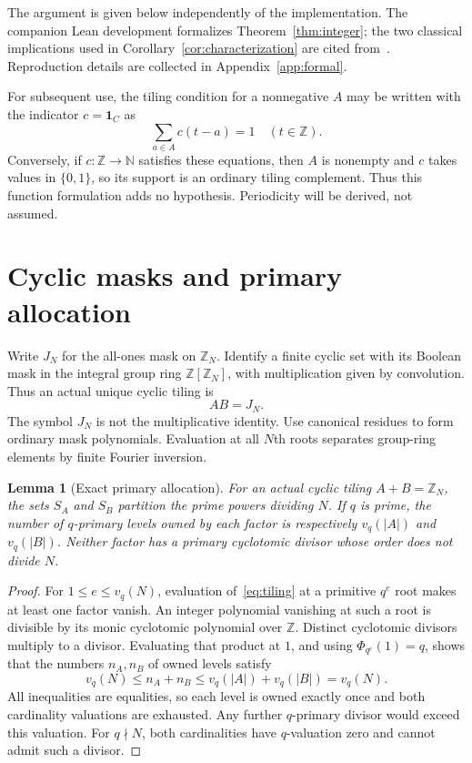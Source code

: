 \documentclass[11pt]{article}
\newtheorem{lemma}[theorem]{Lemma}
\newcommand{\Z}{\mathbb Z}
\newcommand{\PhiC}{\Phi}
\begin{document}
The argument is given below independently of the implementation. The companion Lean development formalizes Theorem~\ref{thm:integer}; the two classical implications used in Corollary~\ref{cor:characterization} are cited from~\cite{CM}. Reproduction details are collected in Appendix~\ref{app:formal}.

For subsequent use, the tiling condition for a nonnegative $A$ may be written with the indicator $c=\mathbf{1}_C$ as
\begin{equation}\label{eq:integer}
 \sum_{a\in A}c(t-a)=1\quad(t\in\Z).
\end{equation}
Conversely, if $c:\Z\to\mathbb N$ satisfies these equations, then $A$ is nonempty and $c$ takes values in $\{0,1\}$, so its support is an ordinary tiling complement. Thus this function formulation adds no hypothesis. Periodicity will be derived, not assumed.

\section{Cyclic masks and primary allocation}
Write $J_N$ for the all-ones mask on $\Z_N$. Identify a finite cyclic set with its Boolean mask in the integral group ring $\Z[\Z_N]$, with multiplication given by convolution. Thus an actual unique cyclic tiling is
\begin{equation}\label{eq:tiling}
 AB=J_N.
\end{equation}
The symbol $J_N$ is not the multiplicative identity. Use canonical residues to form ordinary mask polynomials. Evaluation at all $N$th roots separates group-ring elements by finite Fourier inversion.

\begin{lemma}[Exact primary allocation]\label{lem:allocation}
For an actual cyclic tiling $A+B=\Z_N$, the sets $S_A$ and $S_B$ partition the prime powers dividing $N$. If $q$ is prime, the number of $q$-primary levels owned by each factor is respectively $v_q(|A|)$ and $v_q(|B|)$. Neither factor has a primary cyclotomic divisor whose order does not divide $N$.
\end{lemma}
\begin{proof}
For $1\le e\le v_q(N)$, evaluation of~\eqref{eq:tiling} at a primitive $q^e$ root makes at least one factor vanish. An integer polynomial vanishing at such a root is divisible by its monic cyclotomic polynomial over $\Z$. Distinct cyclotomic divisors multiply to a divisor. Evaluating that product at $1$, and using $\PhiC_{q^e}(1)=q$, shows that the numbers $n_A,n_B$ of owned levels satisfy
\[
 v_q(N)\le n_A+n_B\le v_q(|A|)+v_q(|B|)=v_q(N).
\]
All inequalities are equalities, so each level is owned exactly once and both cardinality valuations are exhausted. Any further $q$-primary divisor would exceed this valuation. For $q\nmid N$, both cardinalities have $q$-valuation zero and cannot admit such a divisor.
\end{proof}
\end{document}
